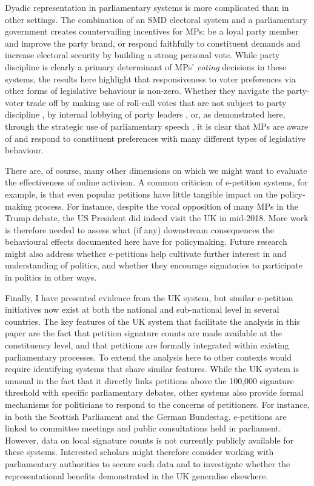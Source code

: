\documentclass[12pt]{article}
\begin{document}
Dyadic representation in parliamentary systems is more complicated than in other settings. The combination of an SMD electoral system and a parliamentary government creates countervailing incentives for MPs: be a loyal party member and improve the party brand, or respond faithfully to constituent demands and increase electoral security by building a strong personal vote. While party discipline is clearly a primary determinant of MPs' \emph{voting} decisions in these systems, the results here highlight that responsiveness to voter preferences via other forms of legislative behaviour is non-zero. Whether they navigate the party-voter trade off by making use of roll-call votes that are not subject to party discipline \citep{hanretty2016dyadic}, by internal lobbying of party leaders \citep{butler2017party}, or, as demonstrated here, through the strategic use of parliamentary speech \citep{soroka2009constituency, blidook2011constituency}, it is clear that MPs are aware of and respond to constituent preferences with many different types of legislative behaviour.

There are, of course, many other dimensions on which we might want to evaluate the effectiveness of online activism. A common criticism of e-petition systems, for example, is that even popular petitions have little tangible impact on the policy-making process. For instance, despite the vocal opposition of many MPs in the Trump debate, the US President did indeed visit the UK in mid-2018. More work is therefore needed to assess what (if any) downstream consequences the behavioural effects documented here have for policymaking. Future research might also address whether e-petitions help cultivate further interest in and understanding of  politics, and whether they encourage signatories to participate in politics in other ways. 

Finally, I have presented evidence from the UK system, but similar e-petition initiatives now exist at both the national and sub-national level in several countries. The key features of the UK system that facilitate the analysis in this paper are the fact that petition signature counts are made available at the constituency level, and that petitions are formally integrated within existing parliamentary processes. To extend the analysis here to other contexts would require identifying systems that share similar features. While the UK system is unusual in the fact that it directly links petitions above the 100,000 signature threshold with specific parliamentary debates, other systems also provide formal mechanisms for politicians to respond to the concerns of petitioners. For instance, in both the Scottish Parliament and the German Bundestag, e-petitions are linked to committee meetings and public consultations held in parliament. However, data on local signature counts is not currently publicly available for these systems. Interested scholars might therefore consider working with parliamentary authorities to secure such data and to investigate whether the representational benefits demonstrated in the UK generalise elsewhere. 
\end{document}
